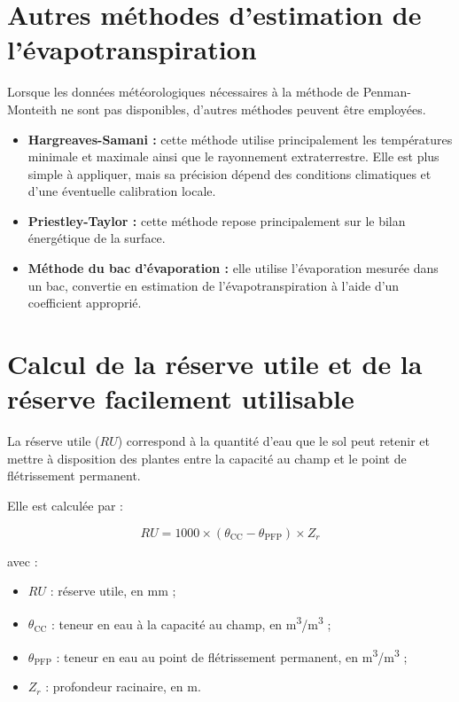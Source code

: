 \section{Autres méthodes d'estimation de l'évapotranspiration}

Lorsque les données météorologiques nécessaires à la méthode de Penman-Monteith ne sont pas disponibles, d'autres méthodes peuvent être employées.

\begin{itemize}[label=$\bullet$]
    \item \textbf{Hargreaves-Samani :} cette méthode utilise principalement les températures minimale et maximale ainsi que le rayonnement extraterrestre. Elle est plus simple à appliquer, mais sa précision dépend des conditions climatiques et d'une éventuelle calibration locale.
    \item \textbf{Priestley-Taylor :} cette méthode repose principalement sur le bilan énergétique de la surface.
    \item \textbf{Méthode du bac d'évaporation :} elle utilise l'évaporation mesurée dans un bac, convertie en estimation de l'évapotranspiration à l'aide d'un coefficient approprié.
\end{itemize}

\section{Calcul de la réserve utile et de la réserve facilement utilisable}

La réserve utile ($RU$) correspond à la quantité d'eau que le sol peut retenir et mettre à disposition des plantes entre la capacité au champ et le point de flétrissement permanent.

Elle est calculée par :

\begin{equation}
    RU = 1000 \times (\theta_{\mathrm{CC}} - \theta_{\mathrm{PFP}}) \times Z_r
    \label{eq:ann_ru}
\end{equation}

\noindent avec :

\begin{itemize}[label=$\bullet$]
    \item $RU$ : réserve utile, en mm ;
    \item $\theta_{\mathrm{CC}}$ : teneur en eau à la capacité au champ, en m\textsuperscript{3}/m\textsuperscript{3} ;
    \item $\theta_{\mathrm{PFP}}$ : teneur en eau au point de flétrissement permanent, en m\textsuperscript{3}/m\textsuperscript{3} ;
    \item $Z_r$ : profondeur racinaire, en m.
\end{itemize}

